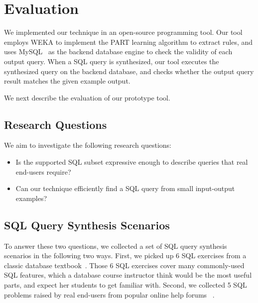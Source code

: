 
\section{Evaluation}
\label{sec:evaluation}

We implemented our technique in an open-source programming tool.
Our tool employs WEKA \cite{Hall:2009} to implement the PART learning algorithm
 to extract rules, and uses MySQL~\cite{mysql} as the backend database engine
to check the validity of each output query.
When a SQL query is synthesized,
our tool executes the synthesized query on the backend database,
and checks whether the output query result matches the given example output.

We next describe the evaluation of our prototype tool.

\subsection{Research Questions}

We aim to investigate the following research questions:

\begin{itemize}
\item Is the supported SQL subset expressive enough to describe
queries that real end-users require?

\item Can our technique efficiently find a SQL query
from small input-output examples?


\end{itemize}


\subsection{SQL Query Synthesis Scenarios}

To answer these two questions, we collected a set
of SQL query synthesis scenarios in the following
two ways. First, we picked
up 6 SQL exercises from a classic database textbook~\cite{cowbook}.
Those 6 SQL exercises cover many commonly-used SQL features,
which a database course instructor think would be the most useful parts,
and expect her students to get familiar with. Second, we collected
5 SQL problems raised by real end-users from popular online help forums
~\cite{stackoverflow, tutorialized, dbjournal}.

